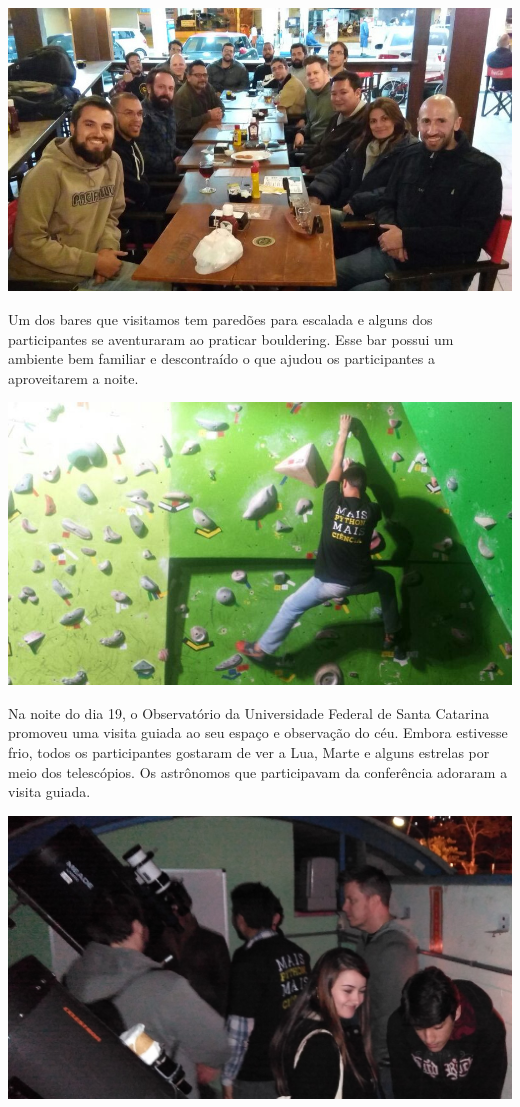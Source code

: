 \documentclass[12pt]{article}
\begin{document}
\noindent  %
\includegraphics[width=\textwidth]{social-viking.jpg}

Um dos bares que visitamos tem paredões para escalada
e alguns dos participantes se aventuraram ao praticar bouldering.
Esse bar possui um ambiente bem familiar e descontraído
o que ajudou os participantes a aproveitarem a noite.

\noindent  %
\includegraphics[width=\textwidth]{python-escala.jpg}

Na noite do dia 19, o Observatório da Universidade Federal de Santa Catarina
promoveu uma visita guiada ao seu espaço e observação do céu.
Embora estivesse frio, todos os participantes gostaram de ver a Lua, Marte e
alguns estrelas por meio dos telescópios.
Os astrônomos que participavam da conferência adoraram a visita guiada.

\noindent  %
\includegraphics[width=\textwidth]{social-astro.jpg}
\end{document}
